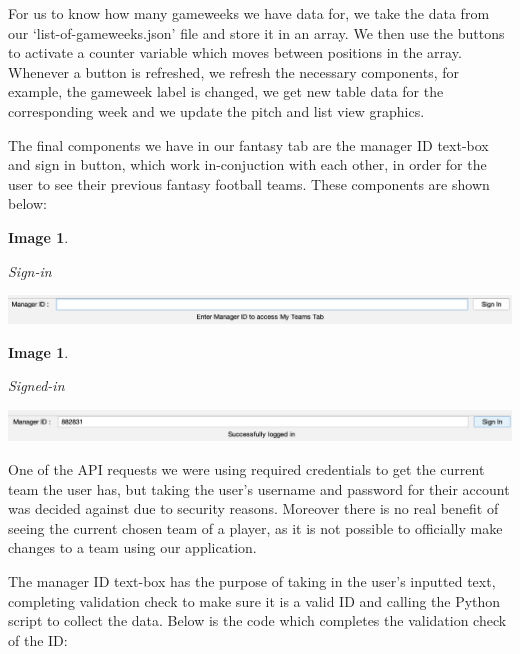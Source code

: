\documentclass[12pt, a4paper, oneside]{book}
\newtheorem{image}[theorem]{Image}
\numberwithin{equation}{section}
\begin{document}
For us to know how many gameweeks we have data for, we take the data from our `list-of-gameweeks.json' file and store it in an array. We then use the buttons to activate a counter variable which moves between positions in the array. Whenever a button is refreshed, we refresh the necessary components, for example, the gameweek label is changed, we get new table data for the corresponding week and we update the pitch and list view graphics.

\vspace{0.5cm}

The final components we have in our fantasy tab are the manager ID text-box and sign in button, which work in-conjuction with each other, in order for the user to see their previous fantasy football teams. These components are shown below:

\begin{image} \label{Sign-in}

  Sign-in

  \vspace{0.5cm}

  \centerline{\includegraphics[width=1\textwidth]{images/gui/fantasy-tab/sign-in.png}}

\end{image}

\begin{image} \label{Signed-in}

  Signed-in

  \vspace{0.5cm}

  \centerline{\includegraphics[width=1\textwidth]{images/gui/fantasy-tab/signed-in.png}}

\end{image}

One of the API requests we were using required credentials to get the current team the user has, but taking the user's username and password for their account was decided against due to security reasons. Moreover there is no real benefit of seeing the current chosen team of a player, as it is not possible to officially make changes to a team using our application.

The manager ID text-box has the purpose of taking in the user's inputted text, completing validation check to make sure it is a valid ID and calling the Python script to collect the data. Below is the code which completes the validation check of the ID:
\end{document}
